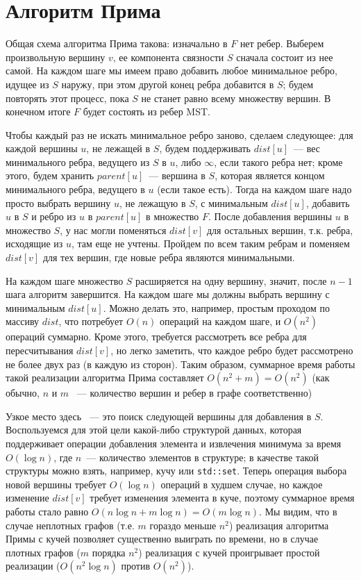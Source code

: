 \documentclass[12pt]{article}
\begin{document}
\section{Алгоритм Прима}

Общая схема алгоритма Прима такова: изначально в $F$ нет ребер. Выберем произвольную вершину $v$, ее компонента связности $S$ сначала состоит из нее самой. На каждом шаге мы имеем право добавить любое минимальное ребро, идущее из $S$ наружу, при этом другой конец ребра добавится в $S$; будем повторять этот процесс, пока $S$ не станет равно всему множеству вершин. В конечном итоге $F$ будет состоять из ребер MST.

Чтобы каждый раз не искать минимальное ребро заново, сделаем следующее: для каждой вершины $u$, не лежащей в $S$, будем поддерживать $dist[u]$~--- вес минимального ребра, ведущего из $S$ в $u$, либо $\infty$, если такого ребра нет; кроме этого, будем хранить $parent[u]$~--- вершина в $S$, которая является концом минимального ребра, ведущего в $u$ (если такое есть). Тогда на каждом шаге надо просто выбрать вершину $u$, не лежащую в $S$, с минимальным $dist[u]$, добавить $u$ в $S$ и ребро из $u$ в $parent[u]$ в множество $F$. После добавления вершины $u$ в множество $S$, у нас могли поменяться $dist[v]$ для остальных вершин, т.к. ребра, исходящие из $u$, там еще не учтены. Пройдем по всем таким ребрам и поменяем $dist[v]$ для тех вершин, где новые ребра являются минимальными.

На каждом шаге множество $S$ расширяется на одну вершину, значит, после $n-1$ шага алгоритм завершится. На каждом шаге мы должны выбрать вершину с минимальным $dist[u]$. Можно делать это, например, простым проходом по массиву $dist$, что потребует $O(n)$ операций на каждом шаге, и $O(n^2)$ операций суммарно. Кроме этого, требуется рассмотреть все ребра для пересчитывания $dist[v]$, но легко заметить, что каждое ребро будет рассмотрено не более двух раз (в каждую из сторон). Таким образом, суммарное время работы такой реализации алгоритма Прима составляет $O(n^2 + m) = O(n^2)$ (как обычно, $n$ и $m$ ~--- количество вершин и ребер в графе соответственно)

Узкое место здесь ~--- это поиск следующей вершины для добавления в $S$. Воспользуемся для этой цели какой-либо структурой данных, которая поддерживает операции добавления элемента и извлечения минимума за время $O(\log n)$, где $n$~--- количество элементов в структуре; в качестве такой структуры можно взять, например, кучу или \texttt{std::set}. Теперь операция выбора новой вершины требует $O(\log n)$ операций в худшем случае, но каждое изменение $dist[v]$ требует изменения элемента в куче, поэтому суммарное время работы стало равно $O(n \log n + m \log n) = O(m \log n)$. Мы видим, что в случае неплотных графов (т.е. $m$ гораздо меньше $n^2$) реализация алгоритма Примы с кучей позволяет существенно выиграть по времени, но в случае плотных графов ($m$ порядка $n^2$) реализация с кучей проигрывает простой реализации ($O(n^2 \log n)$ против $O(n^2)$).
\end{document}
